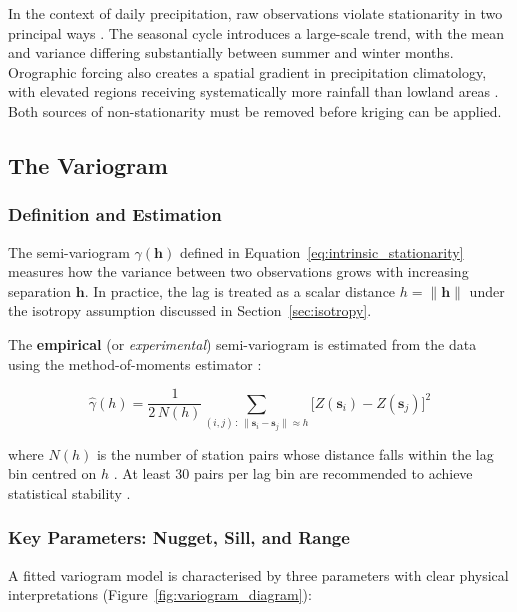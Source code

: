 In the context of daily precipitation, raw observations violate stationarity in
two principal ways \cite{haylock2008european, hofstra2008comparison}.
The seasonal cycle introduces a large-scale trend, with the mean and
variance differing substantially between summer and winter months.
Orographic forcing also creates a spatial gradient in precipitation
climatology, with elevated regions receiving systematically more rainfall
than lowland areas \cite{haylock2008european}.
Both sources of non-stationarity must be removed before kriging can be
applied.


\subsection{The Variogram}
\label{sec:variogram}

\subsubsection{Definition and Estimation}

The semi-variogram $\gamma(\mathbf{h})$ defined in
Equation~\eqref{eq:intrinsic_stationarity} measures how the variance between
two observations grows with increasing separation $\mathbf{h}$.
In practice, the lag is treated as a scalar distance $h = \|\mathbf{h}\|$
under the isotropy assumption discussed in Section~\ref{sec:isotropy}.

The \textbf{empirical} (or \textit{experimental}) semi-variogram is estimated
from the data using the method-of-moments estimator
\cite{matheron1963principles}:

\begin{equation}
    \hat{\gamma}(h) =
    \frac{1}{2\,N(h)}
    \sum_{(i,j)\,:\,\|\mathbf{s}_i - \mathbf{s}_j\| \approx h}
    \bigl[Z(\mathbf{s}_i) - Z(\mathbf{s}_j)\bigr]^2
    \label{eq:empirical_variogram}
\end{equation}

\noindent where $N(h)$ is the number of station pairs whose distance falls
within the lag bin centred on $h$ \cite{cressie1993, haylock2008european}.
At least 30 pairs per lag bin are recommended to achieve statistical stability
\cite{cressie1993}.

\subsubsection{Key Parameters: Nugget, Sill, and Range}

A fitted variogram model is characterised by three parameters with clear
physical interpretations (Figure~\ref{fig:variogram_diagram}):

